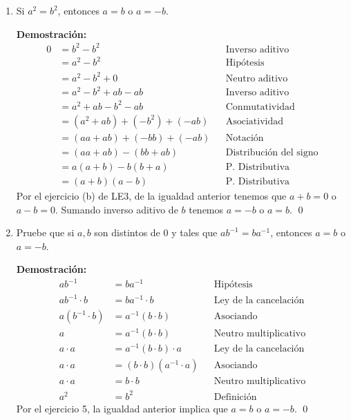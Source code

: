 \documentclass[11pt]{article}
\begin{document}
\begin{enumerate}[label=\alph*)]
    \item Si $a^2=b^2$, entonces $a=b$ o $a=-b$.
        
    \textbf{Demostración:}
        \begin{align*}
        0 &= b^2 - b^2 && \text{Inverso aditivo}\\
        &= a^2 - b^2 && \text{Hipótesis}\\
        &= a^2 - b^2 + 0&& \text{Neutro aditivo}\\
        &= a^2 - b^2 + ab-ab&& \text{Inverso aditivo}\\
        &= a^2 + a b - b^2 -ab && \text{Conmutatividad}\\
        &= (a^2 + a b) + (- b^2)+(-a b)&& \text{Asociatividad}\\
        &= (a a + a b) + (- b b)+(-a b)&& \text{Notación}\\
        &= (a a + a b) -(b b + a b)&& \text{Distribución del signo}\\
        &= a (a+b) - b(b+a) && \text{P. Distributiva}\\
        &= (a+b)  (a-b) && \text{P. Distributiva}
        \end{align*} Por el ejercicio (b) de LE3, de la igualdad anterior tenemos que $a+b=0$ o $a-b=0$. Sumando inverso aditivo de $b$ tenemos $a=-b$ o $a=b$. \qed

    \item Pruebe que si $a,b$ son distintos de $0$ y tales que $ab^{-1}=ba^{-1}$, entonces $a=b$ o $a=-b$.

        \textbf{Demostración:}
        \begin{align*}
        ab^{-1}&=ba^{-1} && \text{Hipótesis}\\
        ab^{-1} \cdot b &=ba^{-1} \cdot b&& \text{Ley de la cancelación}\\
        a(b^{-1} \cdot b) &=a^{-1}(b\cdot b) && \text{Asociando}\\
        a &=a^{-1}(b\cdot b) && \text{Neutro multiplicativo}\\
        a \cdot a&=a^{-1}(b\cdot b) \cdot a&& \text{Ley de la cancelación}\\
        a \cdot a&= (b\cdot b) (a^{-1} \cdot a)&& \text{Asociando}\\
        a \cdot a&= b\cdot b && \text{Neutro multiplicativo}\\
        a^2 &= b^2 && \text{Definición}
        \end{align*}
        Por el ejercicio 5, la igualdad anterior implica que $a=b$ o $a=-b$. \qed


\end{enumerate}
\end{document}

